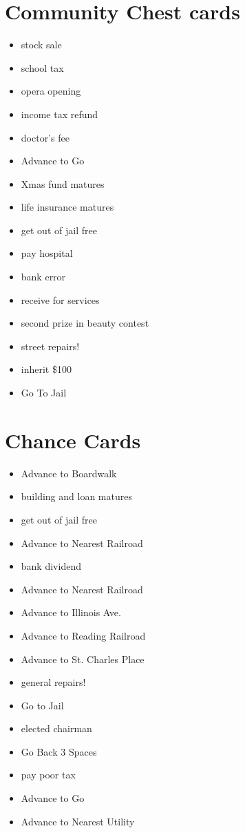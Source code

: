 \documentclass[11pt]{exam}
\begin{document}
\section*{Community Chest cards}
\begin{itemize}
	  \item stock sale
	  \item school tax
	  \item opera opening
	  \item income tax refund
	  \item doctor's fee
	  \item Advance to Go
	  \item Xmas fund matures
	  \item life insurance matures
	  \item get out of jail free
	  \item pay hospital
	  \item bank error
	  \item receive for services
	  \item second prize in beauty contest
	  \item street repairs!
	  \item inherit \$100
	  \item Go To Jail
\end{itemize}

\section*{Chance Cards}
\begin{itemize}
	\item Advance to Boardwalk
	\item building and loan matures
	\item get out of jail free
	\item Advance to Nearest Railroad
	\item bank dividend
	\item Advance to Nearest Railroad
	\item Advance to Illinois Ave.
	\item Advance to Reading Railroad
	\item Advance to St. Charles Place
	\item general repairs!
	\item Go to Jail
	\item elected chairman
	\item Go Back 3 Spaces
	\item pay poor tax
	\item Advance to Go
	\item Advance to Nearest Utility
\end{itemize}
\end{document}
